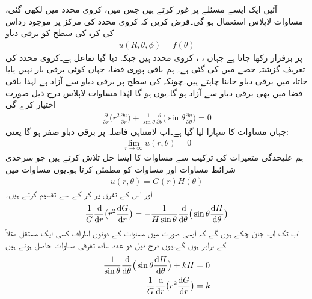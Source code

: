 آئیں ایک ایسے مسئلے پر غور کرتے ہیں جس میں، کروی محدد میں لکھی گئی، مساوات لاپلاس استعمال ہو گی۔فرض کریں کہ کروی محدد کی مرکز پر موجود رداس  کی کرہ  کی سطح کو  برقی دباو 
\begin{align}\label{مساوات_جزوی_کرہ_بار_بردار_الف}
u(R,\theta,\phi)=f(\theta)
\end{align}
پر برقرار رکھا جاتا ہے جہاں ، ،  کروی محدد ہیں جبکہ  دیا گیا تفاعل ہے۔کروی محدد کی تعریف گزشتہ حصے میں کی گئی ہے۔ ہم باقی پوری فضا، جہاں کوئی برقی بار نہیں پایا جاتا، میں برقی دباو  جاننا چاہتے ہیں۔چونکہ  کی سطح پر برقی دباو  سے آزاد ہے لہٰذا باقی فضا میں بھی برقی دباو  سے آزاد ہو گا۔یوں  ہو گا لہٰذا مساوات لاپلاس  درج ذیل صورت اختیار کرے گی
\begin{align}\label{مساوات_جزوی_کرہ_بار_بردار_ب}
\frac{\partial}{\partial r}\big(r^2\frac{\partial u}{\partial r}\big)+\frac{1}{\sin \theta}\frac{\partial}{\partial \theta}\big(\sin \theta \frac{\partial u}{\partial \theta}\big)=0
\end{align}
جہاں مساوات  کا سہارا لیا گیا ہے۔اب لامتناہی فاصلہ پر برقی دباو صفر ہو گا یعنی:
\begin{align}\label{مساوات_جزوی_کرہ_بار_بردار_پ}
\lim_{r\to\infty} u(r,\theta)=0
\end{align}
ہم علیحدگی متغیرات کی ترکیب سے مساوات  کا ایسا حل تلاش کرتے ہیں جو سرحدی شرائط مساوات  اور مساوات  کو مطمئن کرتا ہو۔یوں مساوات  میں
\begin{align}\label{مساوات_جزوی_کرہ_بار_بردار_ت}
u(r,\theta)=G(r)H(\theta)
\end{align}
اور اس کے تفرق پر کر کے  سے تقسیم کرتے ہیں۔
\begin{align*}
\frac{1}{G}\frac{\dif}{\dif r}\big(r^2\frac{\dif G}{\dif r}\big)=-\frac{1}{H\sin \theta}\frac{\dif}{\dif \theta}\big(\sin \theta \frac{\dif H}{\dif \theta}\big)
\end{align*}
اب تک آپ جان چکے ہوں گے کہ ایسی صورت میں مساوات کے دونوں اطراف کسی ایک مستقل مثلاً  کے برابر ہوں گے۔یوں درج ذیل دو عدد سادہ تفرقی مساوات حاصل ہوتے ہیں
\begin{align}
\frac{1}{\sin\theta}\frac{\dif}{\dif \theta}\big(\sin\theta\frac{\dif H}{\dif \theta}\big)+kH&=0\label{مساوات_جزوی_کرہ_بار_بردار_ٹ}\\
\frac{1}{G}\frac{\dif}{\dif r}\big(r^2\frac{\dif G}{\dif r}\big)&=k\label{مساوات_جزوی_کرہ_بار_بردار_ث}
\end{align}
